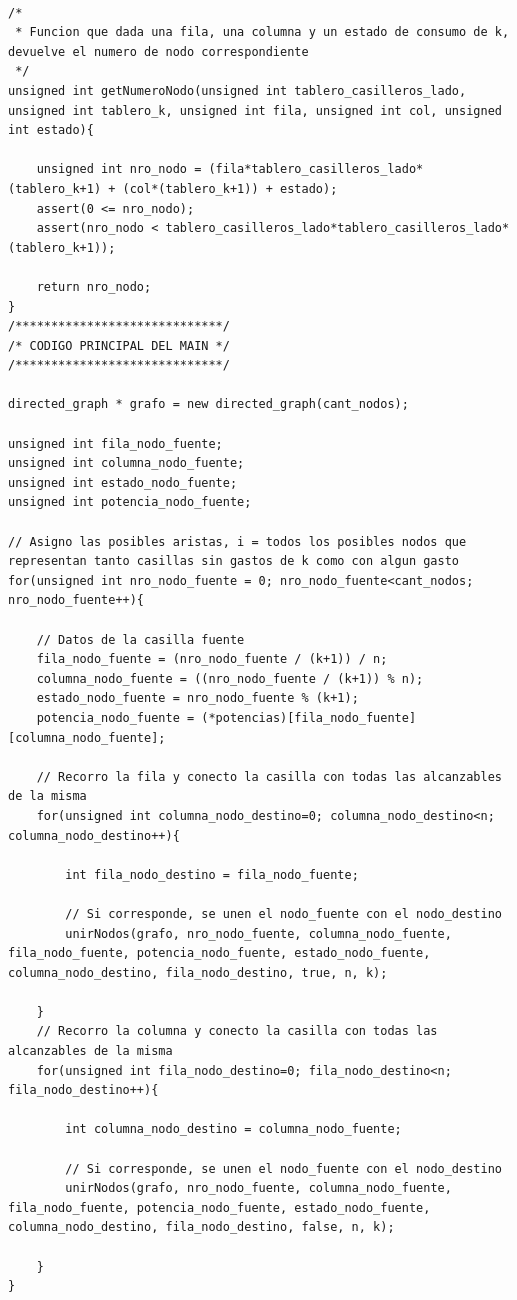 \newpage

\begin{lstlisting}

/*
 * Funcion que dada una fila, una columna y un estado de consumo de k, devuelve el numero de nodo correspondiente
 */
unsigned int getNumeroNodo(unsigned int tablero_casilleros_lado, unsigned int tablero_k, unsigned int fila, unsigned int col, unsigned int estado){
	
	unsigned int nro_nodo = (fila*tablero_casilleros_lado*(tablero_k+1) + (col*(tablero_k+1)) + estado);
	assert(0 <= nro_nodo);
	assert(nro_nodo < tablero_casilleros_lado*tablero_casilleros_lado*(tablero_k+1));
					
	return nro_nodo;
}
/*****************************/
/* CODIGO PRINCIPAL DEL MAIN */
/*****************************/

directed_graph * grafo = new directed_graph(cant_nodos);
		
unsigned int fila_nodo_fuente;
unsigned int columna_nodo_fuente;
unsigned int estado_nodo_fuente;
unsigned int potencia_nodo_fuente;

// Asigno las posibles aristas, i = todos los posibles nodos que representan tanto casillas sin gastos de k como con algun gasto
for(unsigned int nro_nodo_fuente = 0; nro_nodo_fuente<cant_nodos; nro_nodo_fuente++){
	
	// Datos de la casilla fuente
	fila_nodo_fuente = (nro_nodo_fuente / (k+1)) / n;
	columna_nodo_fuente = ((nro_nodo_fuente / (k+1)) % n);
	estado_nodo_fuente = nro_nodo_fuente % (k+1);
	potencia_nodo_fuente = (*potencias)[fila_nodo_fuente][columna_nodo_fuente];
					
	// Recorro la fila y conecto la casilla con todas las alcanzables de la misma
	for(unsigned int columna_nodo_destino=0; columna_nodo_destino<n; columna_nodo_destino++){
		
		int fila_nodo_destino = fila_nodo_fuente;
		
		// Si corresponde, se unen el nodo_fuente con el nodo_destino
		unirNodos(grafo, nro_nodo_fuente, columna_nodo_fuente, fila_nodo_fuente, potencia_nodo_fuente, estado_nodo_fuente, columna_nodo_destino, fila_nodo_destino, true, n, k);

	}
	// Recorro la columna y conecto la casilla con todas las alcanzables de la misma
	for(unsigned int fila_nodo_destino=0; fila_nodo_destino<n; fila_nodo_destino++){
		
		int columna_nodo_destino = columna_nodo_fuente;
		
		// Si corresponde, se unen el nodo_fuente con el nodo_destino
		unirNodos(grafo, nro_nodo_fuente, columna_nodo_fuente, fila_nodo_fuente, potencia_nodo_fuente, estado_nodo_fuente, columna_nodo_destino, fila_nodo_destino, false, n, k);
		
	}
}

\end{lstlisting}

